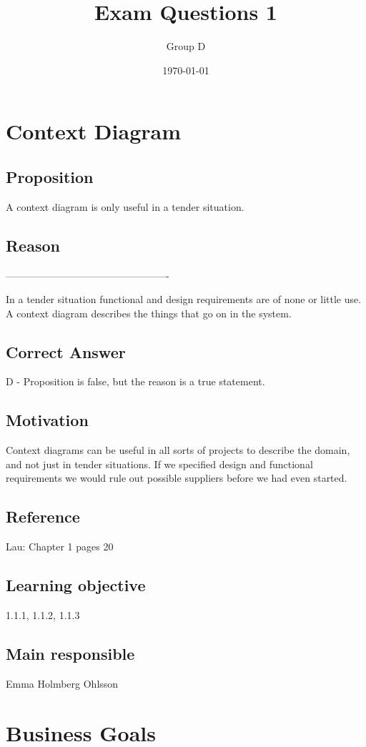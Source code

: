\documentclass[a4paper]{article}
\title{Exam Questions 1}
\author{Group D}
\date{\today}
\begin{document}
	\maketitle
	\thispagestyle{empty}
	\setcounter{page}{0}
	\pagebreak

\section{Context Diagram}
\subsection*{Proposition}
A context diagram is only useful in a tender situation.
\subsection*{Reason}
-------------------------------------------------


In a tender situation functional and design requirements are of none or little use. A context diagram describes the things that go on in the system.
\subsection*{Correct Answer}
D - Proposition is false, but the reason is a true statement.
\subsection*{Motivation}
Context diagrams can be useful in all sorts of projects to describe the domain, and not just in tender situations. If we specified design and functional requirements we would rule out possible suppliers before we had even started.

\subsection*{Reference}
Lau: Chapter 1 pages 20
\subsection*{Learning objective}
1.1.1, 1.1.2, 1.1.3
\subsection*{Main responsible}
Emma Holmberg Ohlsson



\section{Business Goals}
\end{document}
